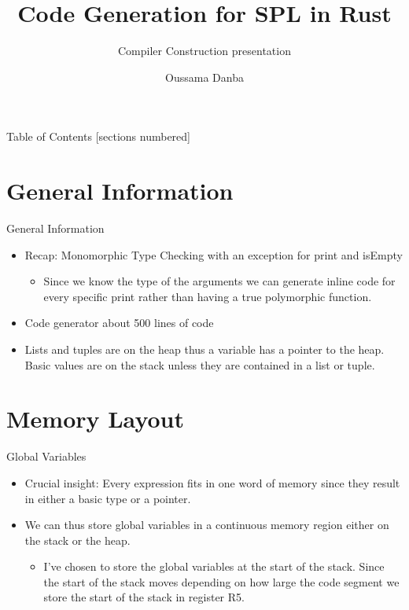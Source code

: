 \documentclass[10pt]{beamer}
\title{Code Generation for SPL in Rust}
\subtitle{Compiler Construction presentation}
\date{}
\author{Oussama Danba}
\begin{document}
\maketitle

\begin{frame}{Table of Contents}
  [sections numbered]
  \tableofcontents[hideallsubsections]
\end{frame}

\section{General Information}
\begin{frame}{General Information}
    \begin{itemize}
        \item Recap: Monomorphic Type Checking with an exception for print and isEmpty
        \begin{itemize}
            \item Since we know the type of the arguments we can generate inline code for every specific print rather than having a true polymorphic function.
        \end{itemize}
        \item Code generator about 500 lines of code
        \item Lists and tuples are on the heap thus a variable has a pointer to the heap. Basic values are on the stack unless they are contained in a list or tuple.
    \end{itemize}
\end{frame}

\section{Memory Layout}
\begin{frame}{Global Variables}
    \begin{itemize}
        \item Crucial insight: Every expression fits in one word of memory since they result in either a basic type or a pointer.
        \item We can thus store global variables in a continuous memory region either on the stack or the heap.
        \begin{itemize}
            \item I've chosen to store the global variables at the start of the stack. Since the start of the stack moves depending on how large the code segment we store the start of the stack in register R5.
        \end{itemize}
    \end{itemize}
\end{frame}
\end{document}
